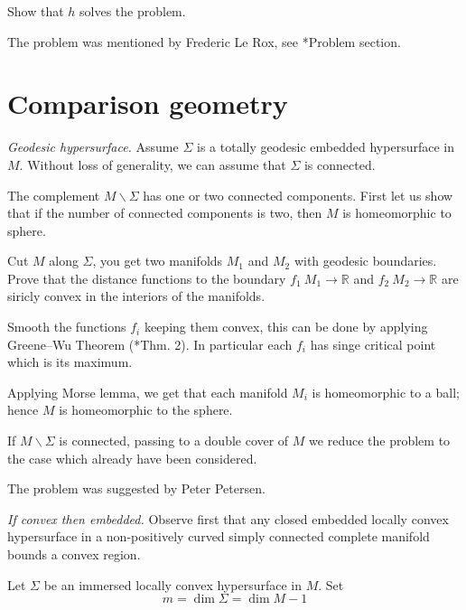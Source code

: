 Show that $h$ solves the problem.

 The problem was mentioned by Frederic Le Rox, see \cite{rox}*{Problem section}.

\section*{Comparison geometry}



\textit{Geodesic hypersurface.}
Assume $\Sigma$ is a totally geodesic embedded hypersurface in $M$.
Without loss of generality, we can assume that $\Sigma$ is connected.

The complement $M\backslash\Sigma$ has one or two connected components.
First let us show that if the number of connected components is two, then $M$ is homeomorphic to sphere.

Cut $M$ along $\Sigma$,
you get two manifolds $M_1$ and $M_2$
with geodesic boundaries. 
Prove that the distance functions to the boundary 
$f_1\:M_1\to\mathbb{R}$ and $f_2\:M_2\to\mathbb{R}$ are siricly convex in the interiors of the manifolds.

Smooth the functions $f_i$ keeping them convex, this can be done by applying Greene--Wu Theorem (\cite{greene-wu}*{Thm. 2}).
In particular each $f_i$ has singe critical point which is its maximum.

Applying Morse lemma, we get that each manifold $M_i$ is homeomorphic to a ball; 
hence $M$ 
is homeomorphic to the sphere.

If $M\backslash\Sigma$ is connected,
passing to a double cover of $M$ 
we reduce the problem to the case which already have been considered.

The problem was suggested by Peter Petersen.



\textit{If convex then embedded.}
Observe first that any closed embedded locally convex hypersurface in a non-positively curved simply connected complete manifold bounds a convex region.


Let $\Sigma$ be an immersed locally convex hypersurface in $M$.
Set 
\[m=\dim \Sigma=\dim M-1\]


